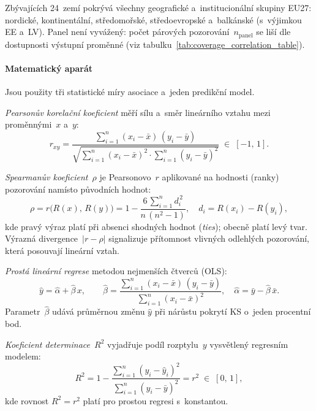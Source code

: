 Zbývajících 24~zemí pokrývá všechny geografické a~institucionální skupiny EU27: nordické, kontinentální, středomořské, středoevropské a~balkánské (s~výjimkou EE a~LV).
Panel není vyvážený: počet párových pozorování~$n_{\text{panel}}$ se liší dle dostupnosti výstupní proměnné (viz tabulku~\ref{tab:coverage_correlation_table}).

\paragraph{Matematický aparát}\label{par:korelace_math}

Jsou použity tři statistické míry asociace a~jeden predikční model.

\emph{Pearsonův korelační koeficient} měří sílu a~směr lineárního vztahu mezi proměnnými~$x$ a~$y$:
\begin{equation}\label{eq:pearson_r}
  r_{xy}
  = \frac{\displaystyle\sum_{i=1}^{n}(x_i - \bar{x})\,(y_i - \bar{y})}
         {\displaystyle\sqrt{\sum_{i=1}^{n}(x_i-\bar{x})^2
                             \cdot \sum_{i=1}^{n}(y_i-\bar{y})^2}}
  \;\in\; [-1,\,1].
\end{equation}

\emph{Spearmanův koeficient~$\rho$} je Pearsonovo~$r$ aplikované na hodnosti (ranky) pozorování namísto původních hodnot:
\begin{equation}\label{eq:spearman_rho}
  \rho = r\!\bigl(R(x),\,R(y)\bigr)
       = 1 - \frac{6\,\displaystyle\sum_{i=1}^{n} d_i^{\,2}}{n\,(n^2-1)},
  \quad d_i = R(x_i) - R(y_i),
\end{equation}
kde pravý výraz platí při absenci shodných hodnot (\textit{ties}); obecně platí levý tvar.
Výrazná divergence~$|r - \rho|$ signalizuje přítomnost vlivných odlehlých pozorování, která posouvají lineární vztah.

\emph{Prostá lineární regrese} metodou nejmenších čtverců (OLS):
\begin{equation}\label{eq:ols}
  \hat{y} = \hat{\alpha} + \hat{\beta}\,x,
  \qquad
  \hat{\beta}
    = \frac{\displaystyle\sum_{i=1}^{n}(x_i-\bar{x})\,(y_i-\bar{y})}
           {\displaystyle\sum_{i=1}^{n}(x_i-\bar{x})^2},
  \quad
  \hat{\alpha} = \bar{y} - \hat{\beta}\,\bar{x}.
\end{equation}
Parametr~$\hat{\beta}$ udává průměrnou změnu $\hat{y}$ při nárůstu pokrytí \ac{KS} o~jeden procentní bod.

\emph{Koeficient determinace}~$R^2$ vyjadřuje podíl rozptylu~$y$ vysvětlený regresním modelem:
\begin{equation}\label{eq:r2}
  R^2
  = 1 - \frac{\displaystyle\sum_{i=1}^{n}(y_i - \hat{y}_i)^2}
             {\displaystyle\sum_{i=1}^{n}(y_i - \bar{y})^2}
  = r^2 \;\in\; [0,\,1],
\end{equation}
kde rovnost $R^2 = r^2$ platí pro prostou regresi s~konstantou.

